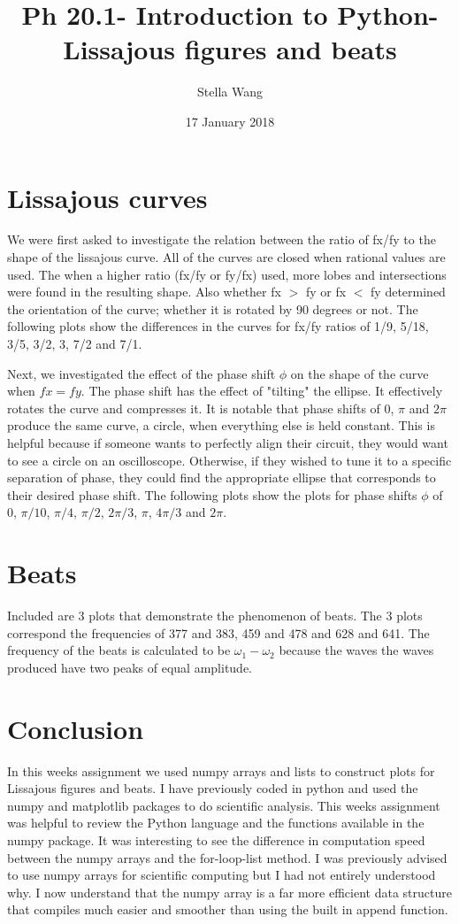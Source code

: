 \documentclass{article}
\title{Ph 20.1- Introduction to Python- Lissajous figures and beats}
\author{Stella Wang}
\date{17 January 2018}
\begin{document}
	\maketitle
\section{Lissajous curves}
We were first asked to investigate the relation between the ratio of fx/fy to the shape of the lissajous curve. All of the curves are closed when rational values are used. The when a higher ratio (fx/fy or fy/fx) used, more lobes and intersections were found in the resulting shape. Also whether fx $>$ fy or fx $<$ fy determined the orientation of the curve; whether it is rotated by 90 degrees or not. The following plots show the differences in the curves for fx/fy ratios of 1/9, 5/18, 3/5, 3/2, 3, 7/2 and 7/1.


Next, we investigated the effect of the phase shift $\phi$ on the shape of the curve when $fx=fy$. The phase shift has the effect of "tilting" the ellipse. It effectively rotates the curve and compresses it. It is notable that phase shifts of 0, $\pi$ and $2\pi$ produce the same curve, a circle, when everything else is held constant. This is helpful because if someone wants to perfectly align their circuit, they would want to see a circle on an oscilloscope. Otherwise, if they wished to tune it to a specific separation of phase, they could find the appropriate ellipse that corresponds to their desired phase shift. The following plots show the plots for phase shifts $\phi$ of 0, $\pi/10$, $\pi/4$, $\pi/2$, $2\pi/3$, $\pi$, $4\pi/3$ and $2\pi$.

 
 \section{Beats}
 Included are 3 plots that demonstrate the phenomenon of beats. The 3 plots correspond the frequencies of 377 and 383, 459 and 478 and 628 and 641. The frequency of the beats is calculated to be $\omega_1 - \omega_2$ because the waves the waves produced have two peaks of equal amplitude.
 
 
 \section{Conclusion}
 In this weeks assignment we used numpy arrays and lists to construct plots for Lissajous figures and beats. I have previously coded in python and used the numpy and matplotlib packages to do scientific analysis. This weeks assignment was helpful to review the Python language and the functions available in the numpy package. It was interesting to see the difference in computation speed between the numpy arrays and the for-loop-list method. I was previously advised to use numpy arrays for scientific computing but I had not entirely understood why. I now understand that the numpy array is a far more efficient data structure that compiles much easier and smoother than using the built in append function. 
 
\end{document}
